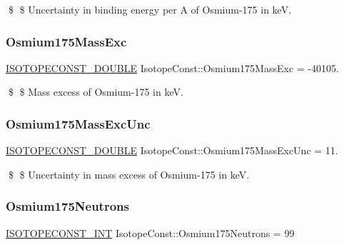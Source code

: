 \$ \$ Uncertainty in binding energy per A of Osmium-\/175 in keV. \mbox{\label{group___isotope_const-_osmium-_os175_gaf1f9f6203ce566f0e4068112266f80d7}} 
\subsubsection{\texorpdfstring{Osmium175\+Mass\+Exc}{Osmium175MassExc}}
{\footnotesize\ttfamily \mbox{\hyperlink{group___isotope_const-_macros_ga8f45a7272ce02c0b4c65c44636ed719a}{I\+S\+O\+T\+O\+P\+E\+C\+O\+N\+S\+T\+\_\+\+D\+O\+U\+B\+LE}} Isotope\+Const\+::\+Osmium175\+Mass\+Exc = -\/40105.}

\$ \$ Mass excess of Osmium-\/175 in keV. \mbox{\label{group___isotope_const-_osmium-_os175_gab37a73d946258de14fa55febcf37697b}} 
\subsubsection{\texorpdfstring{Osmium175\+Mass\+Exc\+Unc}{Osmium175MassExcUnc}}
{\footnotesize\ttfamily \mbox{\hyperlink{group___isotope_const-_macros_ga8f45a7272ce02c0b4c65c44636ed719a}{I\+S\+O\+T\+O\+P\+E\+C\+O\+N\+S\+T\+\_\+\+D\+O\+U\+B\+LE}} Isotope\+Const\+::\+Osmium175\+Mass\+Exc\+Unc = 11.}

\$ \$ Uncertainty in mass excess of Osmium-\/175 in keV. \mbox{\label{group___isotope_const-_osmium-_os175_ga4ff2feba03e0610a901d08ae5816c059}} 
\subsubsection{\texorpdfstring{Osmium175\+Neutrons}{Osmium175Neutrons}}
{\footnotesize\ttfamily \mbox{\hyperlink{group___isotope_const-_macros_ga5f18360b3e99483a35c32d789e62621c}{I\+S\+O\+T\+O\+P\+E\+C\+O\+N\+S\+T\+\_\+\+I\+NT}} Isotope\+Const\+::\+Osmium175\+Neutrons = 99}

